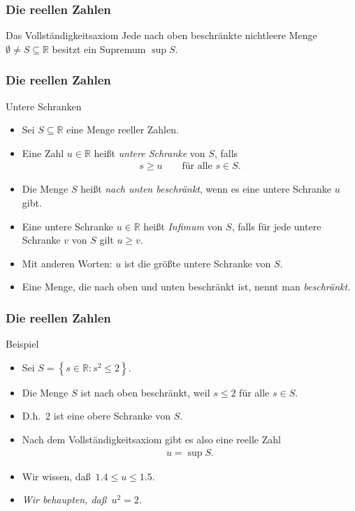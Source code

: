 \documentclass{beamer}
\renewcommand{\emph}[1]{{\textcolor{solarizedRed}{\itshape #1}}}
\newcommand\RR{\mathbb R}
\newcommand\cbc[1]{\left\{{#1}\right\}}
\renewcommand{\ae}{\"a}
\renewcommand{\oe}{\"o}
\newcommand{\ue}{\"u}
\newcommand{\mytitle}{Die reellen Zahlen}
\begin{document}
\begin{frame}\frametitle{\mytitle}
	\begin{block}{Das Vollst\ae ndigkeitsaxiom}
	Jede nach oben beschr\ae nkte nichtleere Menge $\emptyset\neq S\subseteq\RR$ besitzt ein Supremum $\sup S$.
	\end{block}
\end{frame}

\begin{frame}\frametitle{\mytitle}
	\begin{block}{Untere Schranken}
	\begin{itemize}
		\item Sei $S\subseteq\RR$ eine Menge reeller Zahlen.
		\item Eine Zahl $u\in\RR$ hei\ss t \emph{untere Schranke} von $S$, falls
			\begin{align*}
				s\geq u\qquad\mbox{f\ue r alle }s\in S.
			\end{align*}
		\item Die Menge $S$ hei\ss t \emph{nach unten beschr\ae nkt}, wenn es eine untere Schranke $u$ gibt.
		\item Eine untere Schranke $u\in\RR$ hei\ss t \emph{Infimum} von $S$, falls f\ue r jede untere Schranke $v$ von $S$ gilt $u\geq v$.
		\item Mit anderen Worten: $u$ ist die \alert{gr\oe\ss te} untere Schranke von $S$.
		\item Eine Menge, die nach oben und unten beschr\ae nkt ist, nennt man \emph{beschr\ae nkt}.
	\end{itemize}
	\end{block}
\end{frame}

\begin{frame}\frametitle{\mytitle}
	\begin{block}{Beispiel}
	\begin{itemize}
		\item Sei $S=\cbc{s\in\RR:s^2\leq2}$.
		\item Die Menge $S$ ist nach oben beschr\ae nkt, weil $s\leq2$ f\ue r alle $s\in S$.
		\item D.h.\ 2 ist eine obere Schranke von $S$.
		\item Nach dem Vollst\ae ndigkeitsaxiom gibt es also eine reelle Zahl
			\begin{align*}
			u=\sup S.
			\end{align*}
		\item Wir wissen, da\ss\ $1.4\leq u\leq 1.5$.
		\item {\itshape Wir behaupten, da\ss\ $u^2=2$.}
	\end{itemize}
	\end{block}
\end{frame}
\end{document}
